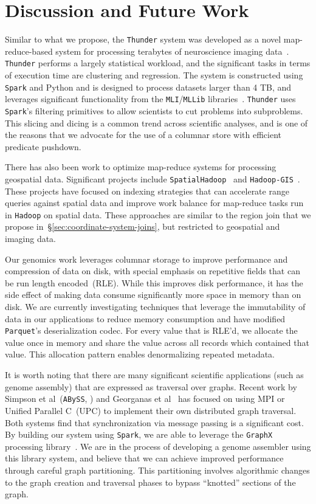 \documentclass{sig-alternate}
\begin{document}
\section{Discussion and Future Work}
\label{sec:discussion-future-work}

Similar to what we propose, the \texttt{Thunder} system was developed as a novel map-reduce-based system for
processing terabytes of neuroscience imaging data~\cite{freeman14}. \texttt{Thunder} performs a largely statistical
workload, and the significant tasks in terms of execution time are clustering and regression. The system is
constructed using \texttt{Spark} and Python and is designed to process datasets larger than 4 TB, and leverages
significant functionality from the \texttt{MLI}/\texttt{MLLib} libraries~\cite{sparks13}. \texttt{Thunder} uses \texttt{Spark}'s
filtering primitives to allow scientists to cut problems into subproblems. This slicing and dicing is a common trend across
scientific analyses, and is one of the reasons that we advocate for the use of a columnar store with efficient predicate
pushdown.

There has also been work to optimize map-reduce systems for processing geospatial data. Significant
projects include \texttt{SpatialHadoop}~\cite{eldawy15} and \texttt{Hadoop-GIS}~\cite{aji13}. These projects have
focused on indexing strategies that can accelerate range queries against spatial data and improve work balance for
map-reduce tasks run in \texttt{Hadoop} on spatial data. These approaches are similar to the region join that we
propose in~\S\ref{sec:coordinate-system-joins}, but restricted to geospatial and imaging data.

Our genomics work leverages columnar storage to improve performance and compression of data on disk,
with special emphasis on repetitive fields that can be run length encoded~(RLE). While this improves
disk performance, it has the side effect of making data consume significantly more space in memory
than on disk. We are currently investigating techniques that leverage the immutability of data in our
applications to reduce memory consumption and have modified \texttt{Parquet}'s deserialization codec. For
every value that is RLE'd, we allocate the value once in memory and share the value across all records which
contained that value. This allocation pattern enables denormalizing repeated metadata.

It is worth noting that there are many significant scientific applications (such as genome
assembly) that are expressed as traversal over graphs. Recent work by Simpson et al~(\texttt{ABySS},
\cite{simpson09}) and Georganas et al~\cite{georganas14} has focused on using MPI
or Unified Parallel C~(UPC) to implement their own distributed graph traversal. Both systems
find that synchronization via message passing is a significant cost. By building our system using \texttt{Spark}, we are
able to leverage the \texttt{GraphX} processing library~\cite{gonzalez14,
xin13}. We are in the process of developing a genome assembler using this library system, and
believe that we can achieve improved performance through careful graph partitioning. This partitioning involves
algorithmic changes to the graph creation and traversal phases to bypass ``knotted'' sections of the graph.
\end{document}
